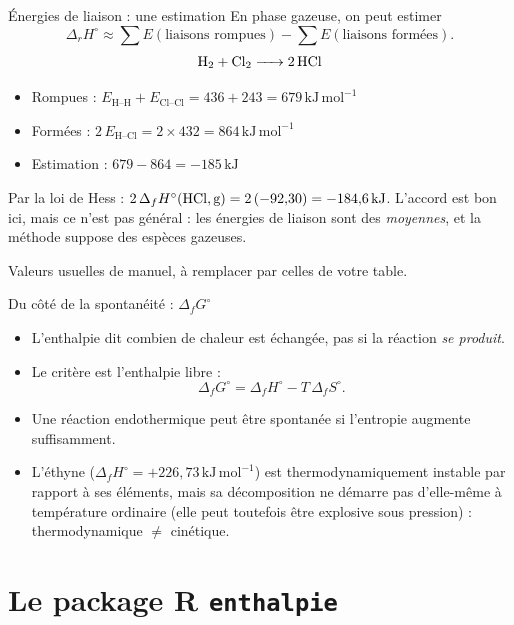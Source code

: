 \documentclass[aspectratio=169,10pt]{beamer}
\newcommand{\dfH}{\Delta_{f}H^{\circ}}
\newcommand{\drH}{\Delta_{r}H^{\circ}}
\newcommand{\kJ}{\ensuremath{\,\mathrm{kJ}}}
\newcommand{\kJmol}{\ensuremath{\,\mathrm{kJ\,mol^{-1}}}}
\begin{document}
\begin{frame}{Énergies de liaison : une estimation}
  En phase gazeuse, on peut estimer
  \[
    \drH \approx \sum E(\text{liaisons rompues}) - \sum E(\text{liaisons formées}).
  \]
  \vspace{-1mm}
  \[ \ce{H2 + Cl2 -> 2 HCl} \]
  \begin{itemize}
    \item Rompues : $E_{\text{H--H}} + E_{\text{Cl--Cl}} = 436 + 243 = 679\kJmol$
    \item Formées : $2\,E_{\text{H--Cl}} = 2 \times 432 = 864\kJmol$
    \item Estimation : $679 - 864 = -185\kJ$
  \end{itemize}
  \vspace{1mm}
  Par la loi de Hess : $2\,\dfH(\ce{HCl},\mathrm{g}) = 2\,(-92{,}30) = -184{,}6\kJ$. L'accord est
  bon ici, mais ce n'est pas général : les énergies de liaison sont des
  \emph{moyennes}, et la méthode suppose des espèces gazeuses.
  \vspace{1mm}

  {\footnotesize Valeurs usuelles de manuel, à remplacer par celles de votre table.}
\end{frame}

\begin{frame}{Du côté de la spontanéité : $\Delta_f G^{\circ}$}
  \begin{itemize}
    \item L'enthalpie dit combien de chaleur est échangée, pas si la réaction
      \emph{se produit}.
    \item Le critère est l'enthalpie libre :
      \[ \Delta_f G^{\circ} = \dfH - T\,\Delta_f S^{\circ}. \]
    \item Une réaction endothermique peut être spontanée si l'entropie augmente
      suffisamment.
    \item L'éthyne  ($\dfH = +226{,}73\kJmol$) est thermodynamiquement
      instable par rapport à ses éléments, mais sa décomposition ne démarre pas
      d'elle-même à température ordinaire (elle peut toutefois être explosive
      sous pression) : thermodynamique $\neq$ cinétique.
  \end{itemize}
\end{frame}

\section{Le package R \texttt{enthalpie}}
\end{document}
